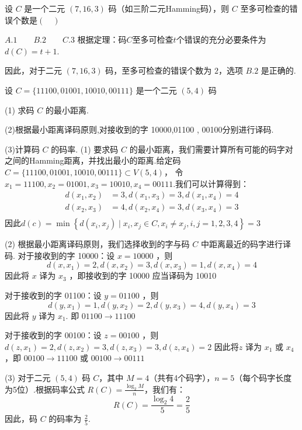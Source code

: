  \begin{tcolorbox}[breakable,colback=blue!5!white,colframe=blue!75!black,
 title= 选择题]

设 $ C $ 是一个二元 $ (7 , 16 , 3 )$  码（如三阶二元Hamming码），则 $C$ 至多可检查的错误个数是$(\quad )$

$A. 1 \qquad  B. 2 \qquad  C. 3$
 \tcblower
根据定理：码$C$至多可检查$t$个错误的充分必要条件为$d(C)=t+1$.

因此，对于二元 $(7, 16, 3)$ 码，至多可检查的错误个数为 $2$，选项 $B. 2$ 是正确的.
 \end{tcolorbox}


\newpage
 \begin{tcolorbox}[breakable,colback=blue!5!white,colframe=blue!75!black,
 title= 解答题]

设 $ C=\{11100,01001,10010,00111\} $ 是一个二元 $ (5,4) $ 码

(1) 求码 $ C $ 的最小距离.

(2)根据最小距离译码原则,对接收到的字 10000,01100 , 00100分别进行译码.

(3)计算码 $ C $ 的码率.
 \tcblower
(1)
要求码 $ C $ 的最小距离，我们需要计算所有可能的码字对之间的Hamming距离，并找出最小的距离.给定码 $ C=\{11100,01001,10010,00111\} \subset V(5,4)$， 令 $x_{1}  =11100, x_{2}=01001, x_{3}=10010, x_{4}=00111 $.我们可以计算得到：
$$
\begin{aligned}
d\left(x_{1}, x_{2}\right) & =3, d\left(x_{1}, x_{3}\right)=3, d\left(x_{1}, x_{4}\right)=4 \\
d\left(x_{2}, x_{3}\right) & =4, d\left(x_{2}, x_{4}\right)=3, d\left(x_{3}, x_{4}\right)=3 \\
\end{aligned}
$$
因此$d(c)=\min \left\{d\left(x_{i}, x_{j}\right) \mid x_{i}, x_{j} \in C, x_{i} \neq x_{j}, i, j=1,2,3,4\right\} =3$

(2) 根据最小距离译码原则，我们选择收到的字与码 $ C $ 中距离最近的码字进行译码.
对于接收到的字 10000：设 $ x=10000 $ ，则
$$
d\left(x, x_{1}\right)=2, d\left(x, x_{2}\right)=3, d\left(x, x_{3}\right)=1, d\left(x, x_{4}\right)=4
$$
因此将 $x$ 译为 $x_{3}$ ，即接收到的字 10000 应当译码为 10010

对于接收到的字 01100：设 $ y=01100 $ ，则
$$
d\left(y, x_{1}\right)=1, d\left(y, x_{2}\right)=2, d\left(y, x_{3}\right)=4, d\left(y, x_{4}\right)=3
$$
因此将 $ y $ 译为 $ x_{1} $. 即 $ 01100 \rightarrow 11100 $

对于接收到的字 00100：设 $ z=00100 $ ，则
$ d\left(z, x_{1}\right)=2, d\left(z, x_{2}\right)=3, d\left(z, x_{3}\right)=3, d\left(z, x_{4}\right)=2 $
因此将$z$ 译为 $ x_{1} $ 或 $ x_{4} $ ，即 $ 00100 \rightarrow 11100 $ 或 $ 00100 \rightarrow 00111 $

(3) 对于二元 $(5,4)$ 码 $ C $，其中 $ M = 4 $（共有4个码字），$ n = 5 $（每个码字长度为5位）.根据码率公式 $ R(C) = \frac{\log_{2} M}{n} $，我们有：
$$
R(C) = \frac{\log_{2} 4}{5} = \frac{2}{5}
$$
因此，码 $ C $ 的码率为 $ \frac{2}{5} $.
 \end{tcolorbox}

